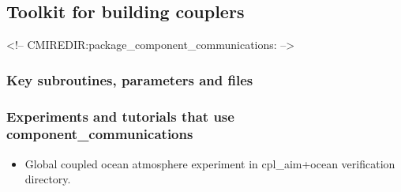 \subsection{Toolkit for building couplers}
\label{sec:component_communications}
\label{sec:pkg:component_communications}
\begin{rawhtml}
<!-- CMIREDIR:package_component_communications: -->
\end{rawhtml}

\subsubsection{Key subroutines, parameters and files}
\label{sec:pkg:component_communications:implementation_synopsis}

\subsubsection{Experiments and tutorials that use component\_communications}
\label{sec:pkg:component_communications:experiments}

\begin{itemize}
\item{Global coupled ocean atmosphere experiment in cpl\_aim+ocean verification directory. }
\end{itemize}
